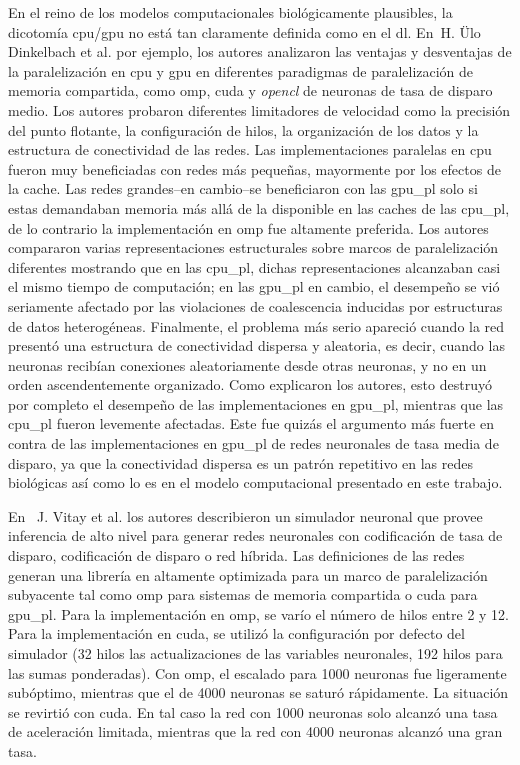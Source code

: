 {En el reino de los modelos computacionales biológicamente plausibles, la dicotomía \gls{cpu}/\gls{gpu} no está tan claramente definida como en el \gls{dl}.
En~H. Ülo Dinkelbach et al. \cite{doi:10.3109/0954898X.2012.739292} por ejemplo, los autores analizaron las ventajas y desventajas de la paralelización en \gls{cpu} y \gls{gpu} en diferentes paradigmas de paralelización de memoria compartida, como \gls{omp}, \gls{cuda} y \emph{\gls{opencl}} de neuronas de tasa de disparo medio.
Los autores probaron diferentes limitadores de velocidad como la precisión del punto flotante, la configuración de hilos, la organización de los datos y la estructura de conectividad de las redes.
Las implementaciones paralelas en \gls{cpu} fueron muy beneficiadas con redes más pequeñas, mayormente por los efectos de la cache.
Las redes grandes--en cambio--se beneficiaron con las \gls{gpu_pl} solo si estas demandaban memoria más allá de la disponible en las caches de las \gls{cpu_pl}, de lo contrario la implementación en \gls{omp} fue altamente preferida.
Los autores compararon varias representaciones estructurales sobre marcos de paralelización diferentes mostrando que en las \gls{cpu_pl}, dichas representaciones alcanzaban casi el mismo tiempo de computación; en las \gls{gpu_pl} en cambio, el desempeño se vió seriamente afectado por las violaciones de coalescencia inducidas por estructuras de datos heterogéneas.
Finalmente, el problema más serio apareció cuando la red presentó una estructura de conectividad dispersa y aleatoria, es decir, cuando las neuronas recibían conexiones aleatoriamente desde otras neuronas, y no en un orden ascendentemente organizado.
Como explicaron los autores, esto destruyó por completo el desempeño de las implementaciones en \gls{gpu_pl}, mientras que las \gls{cpu_pl} fueron levemente afectadas.
Este fue quizás el argumento más fuerte en contra de las implementaciones en \gls{gpu_pl} de redes neuronales de tasa media de disparo, ya que la conectividad dispersa es un patrón repetitivo en las redes biológicas así como lo es en el modelo computacional presentado en este trabajo.

En~ J. Vitay et al. \cite{10.3389/fninf.2015.00019} los autores describieron un simulador neuronal que provee inferencia de alto nivel para generar redes neuronales con codificación de tasa de disparo, codificación de disparo o red híbrida.
Las definiciones de las redes generan una librería en \CC altamente optimizada para un marco de paralelización subyacente tal como \gls{omp} para sistemas de memoria compartida o \gls{cuda} para \gls{gpu_pl}.
Para la implementación en \gls{omp}, se varío el número de hilos entre 2 y 12.
Para la implementación en \gls{cuda}, se utilizó la configuración por defecto del simulador (32 hilos las actualizaciones de las variables neuronales, 192 hilos para las sumas ponderadas).
Con \gls{omp}, el escalado para 1000 neuronas fue ligeramente subóptimo, mientras que el de 4000 neuronas se saturó rápidamente.
La situación se revirtió con \gls{cuda}.
En tal caso la red con 1000 neuronas solo alcanzó una tasa de aceleración limitada, mientras que la red con 4000 neuronas alcanzó una gran tasa.

}

